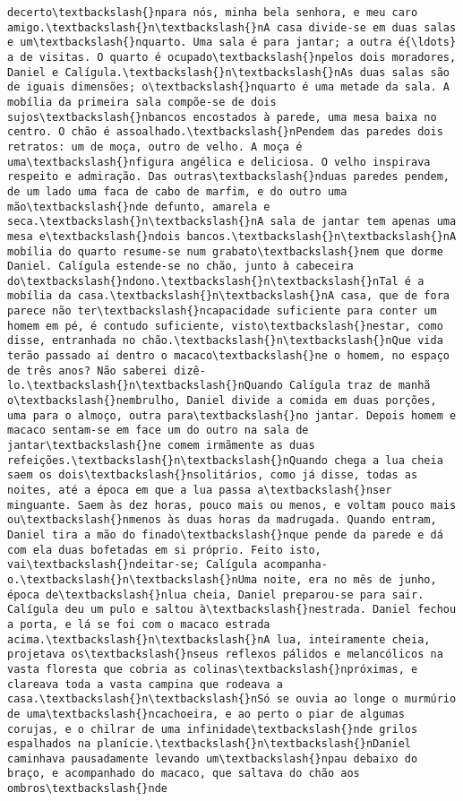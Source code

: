 \documentclass[11pt]{article}
\begin{document}
\begin{Verbatim}[commandchars=\\\{\}]
decerto\textbackslash{}npara nós, minha bela senhora, e meu caro amigo.\textbackslash{}n\textbackslash{}nA casa divide-se em duas salas e um\textbackslash{}nquarto. Uma sala é para jantar; a outra é{\ldots} a de visitas. O quarto é ocupado\textbackslash{}npelos dois moradores, Daniel e Calígula.\textbackslash{}n\textbackslash{}nAs duas salas são de iguais dimensões; o\textbackslash{}nquarto é uma metade da sala. A mobília da primeira sala compõe-se de dois sujos\textbackslash{}nbancos encostados à parede, uma mesa baixa no centro. O chão é assoalhado.\textbackslash{}nPendem das paredes dois retratos: um de moça, outro de velho. A moça é uma\textbackslash{}nfigura angélica e deliciosa. O velho inspirava respeito e admiração. Das outras\textbackslash{}nduas paredes pendem, de um lado uma faca de cabo de marfim, e do outro uma mão\textbackslash{}nde defunto, amarela e seca.\textbackslash{}n\textbackslash{}nA sala de jantar tem apenas uma mesa e\textbackslash{}ndois bancos.\textbackslash{}n\textbackslash{}nA mobília do quarto resume-se num grabato\textbackslash{}nem que dorme Daniel. Calígula estende-se no chão, junto à cabeceira do\textbackslash{}ndono.\textbackslash{}n\textbackslash{}nTal é a mobília da casa.\textbackslash{}n\textbackslash{}nA casa, que de fora parece não ter\textbackslash{}ncapacidade suficiente para conter um homem em pé, é contudo suficiente, visto\textbackslash{}nestar, como disse, entranhada no chão.\textbackslash{}n\textbackslash{}nQue vida terão passado aí dentro o macaco\textbackslash{}ne o homem, no espaço de três anos? Não saberei dizê-lo.\textbackslash{}n\textbackslash{}nQuando Calígula traz de manhã o\textbackslash{}nembrulho, Daniel divide a comida em duas porções, uma para o almoço, outra para\textbackslash{}no jantar. Depois homem e macaco sentam-se em face um do outro na sala de jantar\textbackslash{}ne comem irmãmente as duas refeições.\textbackslash{}n\textbackslash{}nQuando chega a lua cheia saem os dois\textbackslash{}nsolitários, como já disse, todas as noites, até a época em que a lua passa a\textbackslash{}nser minguante. Saem às dez horas, pouco mais ou menos, e voltam pouco mais ou\textbackslash{}nmenos às duas horas da madrugada. Quando entram, Daniel tira a mão do finado\textbackslash{}nque pende da parede e dá com ela duas bofetadas em si próprio. Feito isto, vai\textbackslash{}ndeitar-se; Calígula acompanha-o.\textbackslash{}n\textbackslash{}nUma noite, era no mês de junho, época de\textbackslash{}nlua cheia, Daniel preparou-se para sair. Calígula deu um pulo e saltou à\textbackslash{}nestrada. Daniel fechou a porta, e lá se foi com o macaco estrada acima.\textbackslash{}n\textbackslash{}nA lua, inteiramente cheia, projetava os\textbackslash{}nseus reflexos pálidos e melancólicos na vasta floresta que cobria as colinas\textbackslash{}npróximas, e clareava toda a vasta campina que rodeava a casa.\textbackslash{}n\textbackslash{}nSó se ouvia ao longe o murmúrio de uma\textbackslash{}ncachoeira, e ao perto o piar de algumas corujas, e o chilrar de uma infinidade\textbackslash{}nde grilos espalhados na planície.\textbackslash{}n\textbackslash{}nDaniel caminhava pausadamente levando um\textbackslash{}npau debaixo do braço, e acompanhado do macaco, que saltava do chão aos ombros\textbackslash{}nde 
\end{Verbatim}
\end{document}

